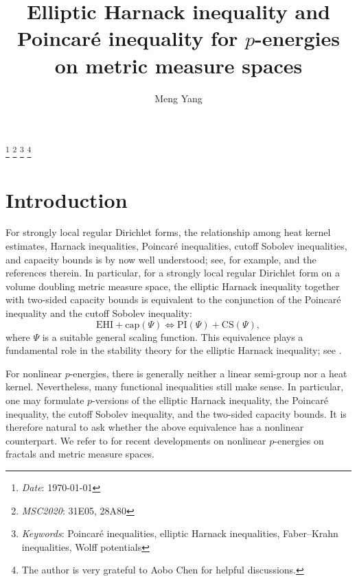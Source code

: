 \documentclass[11pt,a4paper]{article}
\numberwithin{equation}{section}
\theoremstyle{plain}
\theoremstyle{definition}
\renewcommand{\thefootnote}{}
\begin{document}
\title{\normalsize{Elliptic Harnack inequality and Poincar\'e inequality for $p$-energies on metric measure spaces}}
\author{Meng Yang}
\date{}

\maketitle


\footnote{\textsl{Date}: \today}
\footnote{\textsl{MSC2020}: 31E05, 28A80}
\footnote{\textsl{Keywords}: Poincar\'e inequalities, elliptic Harnack inequalities, Faber--Krahn inequalities, Wolff potentials}
\footnote{The author is very grateful to Aobo Chen for helpful discussions.}

\renewcommand{\thefootnote}{\arabic{footnote}}
\setcounter{footnote}{0}

\section{Introduction}\label{sec_intro}

For strongly local regular Dirichlet forms, the relationship among heat kernel estimates, Harnack inequalities, Poincar\'e inequalities, cutoff Sobolev inequalities, and capacity bounds is by now well understood; see, for example, \cite{BBK06,GT12,GH14,AB15,GHL15,Eri26} and the references therein. In particular, for a strongly local regular Dirichlet form on a volume doubling metric measure space, the elliptic Harnack inequality together with two-sided capacity bounds is equivalent to the conjunction of the Poincar\'e inequality and the cutoff Sobolev inequality:
$$\text{EHI}+\text{cap}(\Psi)\Leftrightarrow\text{PI}(\Psi)+\text{CS}(\Psi),$$
where $\Psi$ is a suitable general scaling function. This equivalence plays a fundamental role in the stability theory for the elliptic Harnack inequality; see \cite{BM18,KM23}.

For nonlinear $p$-energies, there is generally neither a linear semi-group nor a heat kernel. Nevertheless, many functional inequalities still make sense. In particular, one may formulate $p$-versions of the elliptic Harnack inequality, the Poincar\'e inequality, the cutoff Sobolev inequality, and the two-sided capacity bounds. It is therefore natural to ask whether the above equivalence has a nonlinear counterpart. We refer to \cite{CGQ22,Shi24,BC23,MS25,Kig23,CGYZ26,AB25,AES25a} for recent developments on nonlinear $p$-energies on fractals and metric measure spaces.
\end{document}
